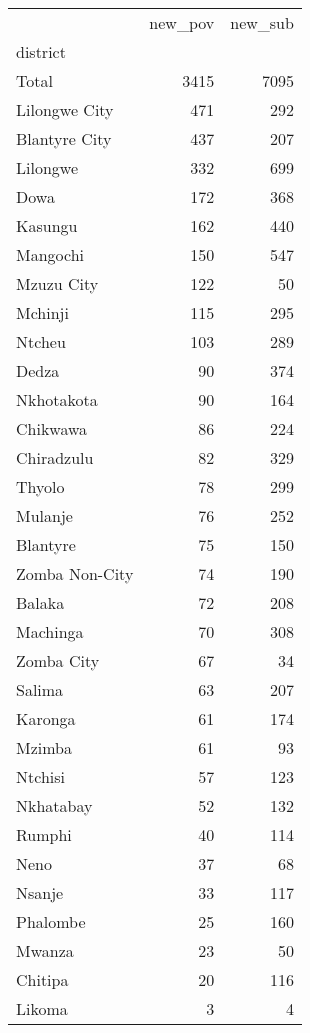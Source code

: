 \begin{tabular}{lrr}
\toprule
{} &  new\_pov &  new\_sub \\
district       &          &          \\
\midrule
Total          &     3415 &     7095 \\
Lilongwe City  &      471 &      292 \\
Blantyre City  &      437 &      207 \\
Lilongwe       &      332 &      699 \\
Dowa           &      172 &      368 \\
Kasungu        &      162 &      440 \\
Mangochi       &      150 &      547 \\
Mzuzu City     &      122 &       50 \\
Mchinji        &      115 &      295 \\
Ntcheu         &      103 &      289 \\
Dedza          &       90 &      374 \\
Nkhotakota     &       90 &      164 \\
Chikwawa       &       86 &      224 \\
Chiradzulu     &       82 &      329 \\
Thyolo         &       78 &      299 \\
Mulanje        &       76 &      252 \\
Blantyre       &       75 &      150 \\
Zomba Non-City &       74 &      190 \\
Balaka         &       72 &      208 \\
Machinga       &       70 &      308 \\
Zomba City     &       67 &       34 \\
Salima         &       63 &      207 \\
Karonga        &       61 &      174 \\
Mzimba         &       61 &       93 \\
Ntchisi        &       57 &      123 \\
Nkhatabay      &       52 &      132 \\
Rumphi         &       40 &      114 \\
Neno           &       37 &       68 \\
Nsanje         &       33 &      117 \\
Phalombe       &       25 &      160 \\
Mwanza         &       23 &       50 \\
Chitipa        &       20 &      116 \\
Likoma         &        3 &        4 \\
\bottomrule
\end{tabular}

